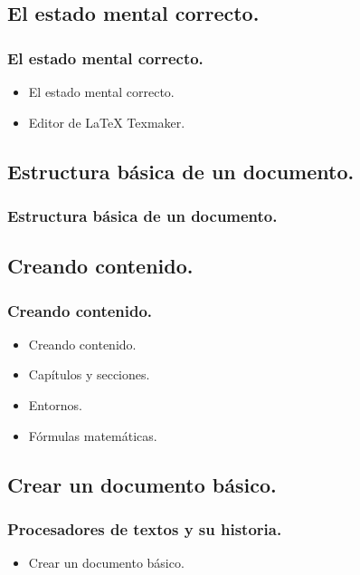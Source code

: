 \documentclass{beamer}
\begin{document}
\subsection{El estado mental correcto.}
\begin{frame}
  \frametitle{El estado mental correcto.}
 \begin{itemize}
  \item<1->{El estado mental correcto.}
  \item<2->{Editor de LaTeX Texmaker.}
  \end{itemize}
\end{frame}

\subsection{Estructura básica de un documento.}
\begin{frame}
  \frametitle{Estructura básica de un documento.}
\end{frame}

\subsection{Creando contenido.}
\begin{frame}
  \frametitle{Creando contenido.}
  \begin{itemize}
  \item<1->{Creando contenido.}
  \item<2->{Capítulos y secciones.}
  \item<3->{Entornos.}
  \item<4->{Fórmulas matemáticas.}
  \end{itemize}
\end{frame}

\subsection{Crear un documento básico.}
\begin{frame}
  \frametitle{Procesadores de textos y su historia.}
  \begin{itemize}
  \item<1->{Crear un documento básico.}
  \end{itemize}
\end{frame}
\end{document}
